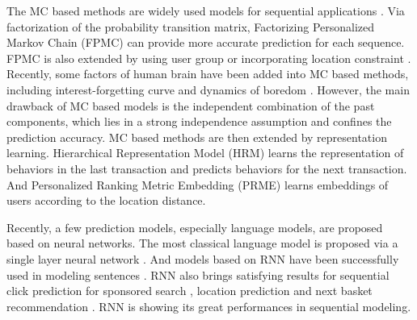 \documentclass[conference]{IEEEtran}
\begin{document}
The MC based methods are widely used models for sequential applications \cite{yang2010personalizing}. Via factorization of the probability transition matrix, Factorizing Personalized Markov Chain (FPMC) \cite{rendle2010factorizing} can provide more accurate prediction for each sequence. FPMC is also extended by using user group \cite{natarajan2013app} or incorporating location constraint \cite{cheng2013you}. Recently, some factors of human brain have been added into MC based methods, including interest-forgetting curve \cite{chen2015personalized} and dynamics of boredom \cite{kapoor2015just}. However, the main drawback of MC based models is the independent combination of the past components, which lies in a strong independence assumption and confines the prediction accuracy. MC based methods are then extended by representation learning. Hierarchical Representation Model (HRM) \cite{wang2015learning} learns the representation of behaviors in the last transaction and predicts behaviors for the next transaction. And Personalized Ranking Metric Embedding (PRME) \cite{feng2015personalized} learns embeddings of users according to the location distance.

Recently, a few prediction models, especially language models, are proposed based on neural networks. The most classical language model is proposed via a single layer neural network \cite{bengio2003neural}. And models based on RNN have been successfully used in modeling sentences \cite{mikolov2010recurrent,mikolov2011extensions,mikolov2011rnnlm}. RNN also brings satisfying results for sequential click prediction for sponsored search \cite{zhang2014sequential}, location prediction \cite{liu2016strnn} and next basket recommendation \cite{yu2016dream}. RNN is showing its great performances in sequential modeling.

\end{document}
